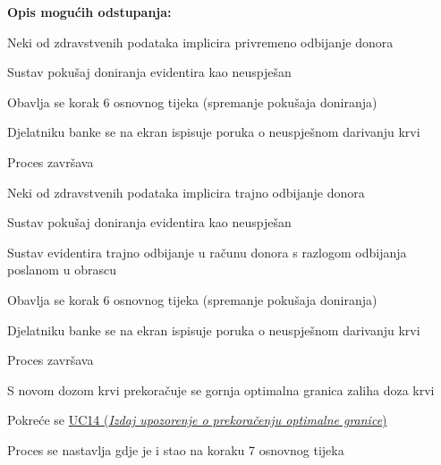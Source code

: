 \begin{packed_item}
						\item  \textbf{Opis mogućih odstupanja:}
						
						\item[] \begin{packed_item}
	
							\item[4.a] Neki od zdravstvenih podataka implicira privremeno odbijanje donora
							\begin{packed_enum}
								\item Sustav pokušaj doniranja evidentira kao neuspješan
								\item Obavlja se korak 6 osnovnog tijeka (spremanje pokušaja doniranja)
								\item Djelatniku banke se na ekran ispisuje poruka o neuspješnom darivanju krvi
								\item Proces završava
							\end{packed_enum}
							
							\item[4.b] Neki od zdravstvenih podataka implicira trajno odbijanje donora
							\begin{packed_enum}
								\item Sustav pokušaj doniranja evidentira kao neuspješan
								\item Sustav evidentira trajno odbijanje u računu donora s razlogom odbijanja poslanom u obrascu
								\item Obavlja se korak 6 osnovnog tijeka (spremanje pokušaja doniranja)
								\item Djelatniku banke se na ekran ispisuje poruka o neuspješnom darivanju krvi
								\item Proces završava
							\end{packed_enum}
							
							\item[7] S novom dozom krvi prekoračuje se gornja optimalna granica zaliha doza krvi
							\begin{packed_enum}
							    \item Pokreće se \hyperref[UC14]{UC14 (\textit{Izdaj upozorenje o prekoračenju optimalne granice})}
								\item Proces se nastavlja gdje je i stao na koraku 7 osnovnog tijeka
							\end{packed_enum}
							
						\end{packed_item}
						
					\end{packed_item}
					
